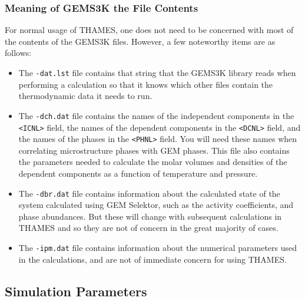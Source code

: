 \documentclass{article}
\begin{document}
\subsubsection{\label{sec:thermodataformat} Meaning of GEMS3K the File Contents}
For normal usage of THAMES, one does not need to be concerned with most of the contents of
the GEMS3K files.  However, a few noteworthy items are as follows:
\begin{itemize}
	\item The \verb!-dat.lst! file contains that string that the GEMS3K library reads when
	      performing a calculation so that it knows which other files contain the thermodynamic
	      data it needs to run.
	\item The \verb!-dch.dat! file contains the names of the independent components
	      in the \verb!<ICNL>! field, the names of the dependent components in the
	      \verb!<DCNL>! field, and the names of the phases in the \verb!<PHNL>! field.
	      You will need these names when correlating microstructure phases with GEM phases.
	      This file also contains the parameters needed to calculate the molar volumes
	      and densities of the dependent components as a function of temperature and pressure.
	\item The \verb!-dbr.dat! file contains information about the calculated state of
	      the system calculated using GEM Selektor, such as the activity coefficients,
	      and phase abundances.  But these will change with subsequent calculations in
	      THAMES and so they are not of concern in the great majority of cases.
	\item The \verb!-ipm.dat! file contains information about the numerical parameters
	      used in the calculations, and are not of immediate concern for using THAMES.
\end{itemize}


\subsection{\label{sec:materialsystemfiles} Simulation Parameters}
\end{document}
